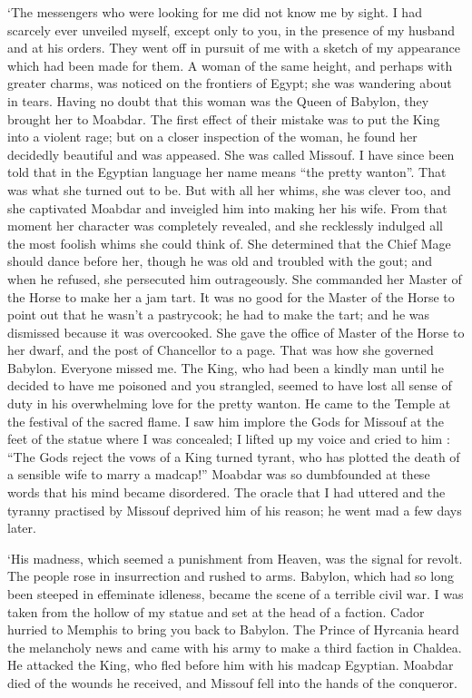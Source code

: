 \documentclass{article}
\begin{document}
\begin{center}
`The messengers who were looking for me did not know me by sight. I had scarcely 
ever unveiled myself, except only to you, in the presence of my husband and at 
his orders. They went off in pursuit of me with a sketch of my appearance which 
had been made for them. A woman of the same height, and perhaps with greater charms, 
was noticed on the frontiers of Egypt; she was wandering about in tears. Having 
no doubt that this woman was the Queen of Babylon, they brought her to Moabdar. 
The first effect of their mistake was to put the King into a violent rage; but 
on a closer inspection of the woman, he found her decidedly beautiful and was appeased. 
She was called Missouf. I have since been told that in the Egyptian language her 
name means ``the pretty wanton''. That was what she turned out to be. But with 
all her whims, she was clever too, and she captivated Moabdar and inveigled him 
into making her his wife. From that moment her character was completely revealed, 
and she recklessly indulged all the most foolish whims she could think of. She 
determined that the Chief Mage should dance before her, though he was old and troubled 
with the gout; and when he refused, she persecuted him outrageously. She commanded 
her Master of the Horse to make her a jam tart. It was no good for the Master of 
the Horse to point out that he wasn't a pastrycook; he had to make the tart; and 
he was dismissed because it was overcooked. She gave the office of Master of the 
Horse to her dwarf, and the post of Chancellor to a page. That was how she governed 
Babylon. Everyone missed me. The King, who had been a kindly man until he decided 
to have me poisoned and you strangled, seemed to have lost all sense of duty in 
his overwhelming love for the pretty wanton. He came to the Temple at the festival 
of the sacred flame. I saw him implore the Gods for Missouf at the feet of the 
statue where I was concealed; I lifted up my voice and cried to him : ``The Gods 
reject the vows of a King turned tyrant, who has plotted the death of a sensible 
wife to marry a madcap!'' Moabdar was so dumbfounded at these words that his mind 
became disordered. The oracle that I had uttered and the tyranny practised by Missouf 
deprived him of his reason; he went mad a few days later. 

`His madness, which seemed a punishment from Heaven, was the signal for revolt. 
The people rose in insurrection and rushed to arms. Babylon, which had so long 
been steeped in effeminate idleness, became the scene of a terrible civil war. 
I was taken from the hollow of my statue and set at the head of a faction. Cador 
hurried to Memphis to bring you back to Babylon. The Prince of Hyrcania heard the 
melancholy news and came with his army to make a third faction in Chaldea. He attacked 
the King, who fled before him with his madcap Egyptian. Moabdar died of the wounds 
he received, and Missouf fell into the hands of the conqueror. 


\end{center}
\end{document}
